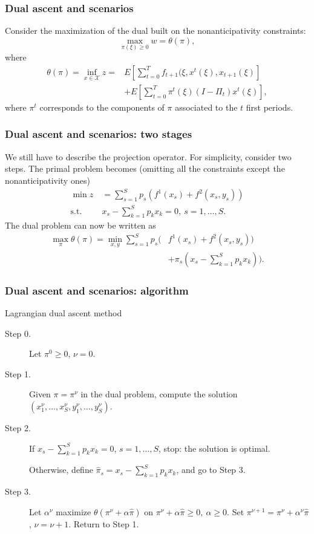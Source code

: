 \documentclass[french]{beamer}
\begin{document}
\begin{frame}
\frametitle{Dual ascent and scenarios}

Consider the maximization of the dual built on the nonanticipativity constraints:
\[
\max_{\pi(\xi) \geq 0} w = \theta(\pi),
\]
where
\begin{align*}
\theta(\pi) = \inf_{x \in \mathcal{X}} z = & 
E\left[\sum_{t = 0}^T f_{t+1} (\xi, x^t(\xi), x_{t+1}(\xi) \right] \\
& + E\left[\sum_{t = 0}^T \pi^t(\xi)(I-\Pi_t)x^t(\xi) \right],
\end{align*}
where $\pi^t$ corresponds to the components of $\pi$ associated to the $t$ first periods.

\end{frame}

\begin{frame}
\frametitle{Dual ascent and scenarios: two stages}

We still have to describe the projection operator.
For simplicity, consider two steps.
The primal problem becomes (omitting all the constraints except the nonanticipativity ones)
\begin{align*}
\min z\ & = \sum_{s = 1}^S p_s \left( f^1(x_s)+f^2(x_s, y_s) \right) \\
\mbox{s.t. } & x_s - \sum_{k=1}^S p_k x_k = 0,\ s=1,\ldots,S. 
\end{align*}
The dual problem can now be written as
\begin{align*}
\max_{\pi} \theta(\pi) = \min_{x,y} \sum_{s=1}^S p_s\Biggl(& f^1(x_s)+f^2(x_s,
y_s))\\
& + \pi_s\left( x_s - \sum_{k=1}^S p_kx_k \right) \Biggr).
\end{align*}

\end{frame}

\begin{frame}
\frametitle{Dual ascent and scenarios: algorithm}

\begin{algo}{Lagrangian dual ascent method}
\begin{description}
\item[Step 0.] Let $\pi^0 \geq 0$, $\nu = 0$.
\item[Step 1.]
Given $\pi = \pi^{\nu}$ in the dual problem, compute the solution
$(x^{\nu}_1, \ldots, x^{\nu}_S, y_1^{\nu},\ldots{},y_S^{\nu})$.
\item[Step 2.]
If $x_s - \sum_{k = 1}^S p_kx_k = 0$, $s = 1,\ldots,S$, stop: the solution is optimal.

Otherwise, define $\hat{\pi}_s = x_s - \sum_{k=1}^S p_kx_k$, and go to Step 3.
\item[Step 3.]
Let $\alpha^\nu$ maximize $\theta(\pi^{\nu}+\alpha\hat{\pi})$ on
$\pi^{\nu}+\alpha\hat{\pi} \geq 0,\ \alpha \geq 0$.
Set $\pi^{\nu+1} = \pi^{\nu} + \alpha^{\nu}\hat{\pi}$, $\nu = \nu+1$. Return to Step 1.
\end{description}
\end{algo}

\end{frame}
\end{document}
